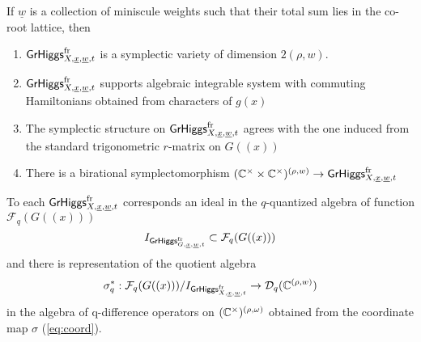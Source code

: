 \documentclass[12pt,psamsfonts,reqno]{amsart}
\begin{document}



 \begin{proposition}
   If $\underline{w}$ is a collection of miniscule weights such that their
   total sum lies in the co-root lattice, then 
   \begin{enumerate}
   \item $\mathsf{GrHiggs}_{X,\underline{x}, \underline{w},t}^{\mathrm{fr}}$ is a symplectic variety of dimension $2 (\rho, w)$.
   \item $\mathsf{GrHiggs}_{X,\underline{x}, \underline{w},t}^{\mathrm{fr}}$ supports
     algebraic integrable system with commuting Hamiltonians obtained
     from characters of $g(x)$
   \item The symplectic structure on $\mathsf{GrHiggs}_{X,\underline{x}, \underline{w},t}^{\mathrm{fr}}$ agrees with the one induced from the
     standard trigonometric $r$-matrix on $G((x))$ 
   \item There is a birational symplectomorphism $(\mathbb C^{\times} \times \mathbb C^{\times})^{(\rho,w)}
     \to \mathsf{GrHiggs}_{X,\underline{x}, \underline{w},t}^{\mathrm{fr}}$
   \end{enumerate}
 \item 
To each $\mathsf{GrHiggs}_{X,\underline{x}, \underline{w}, t}^{\mathrm{fr}}$
   corresponds an ideal in the $q$-quantized algebra of function $\mathcal{F}_q(G((x)))$
   \begin{equation}
     I_{\mathsf{GrHiggs}_{G,\underline{x}, \underline{w}, t}^{\mathrm{fr}}} \subset \mathcal{F}_q(G((x)))
   \end{equation}
   and there is representation  of the quotient algebra
   \begin{equation}
  \sigma_{q}^{*}:    \mathcal{F}_q(G((x)))/     I_{\mathsf{GrHiggs}_{X,\underline{x}, \underline{w}, t}^{\mathrm{fr}}} \to \mathcal{D}_{q}( \mathbb C^{(\rho, w)})
\end{equation}
in the algebra of q-difference operators on $(\mathbb C^\times)^{(\rho,\omega)}$ obtained from the coordinate map $\sigma$ (\ref{eq:coord}). 
 \end{proposition}
  
\end{document}
